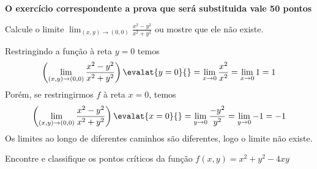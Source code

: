 \documentclass[a4paper,12pt,fleqn]{article}
\begin{document}

\textbf{O exercício correspondente a prova que será substituida vale 50 pontos}

%
%

Calcule o limite
\(
  \lim_{(x, y) \to (0, 0)} \frac{x^2 - y^2}{x^2 + y^2}
\)
ou mostre que ele não existe.

\begin{answer}
  Restringindo a função à reta \( y = 0 \) temos
  \[
    \left(\lim_{(x, y) \to (0, 0)} \frac{x^2 - y^2}{x^2 + y^2}\right) \evalat{y=0}{}
    = \lim_{x\to 0} \frac{x^2}{x^2}
    = \lim_{x\to 0} 1
    = 1
  \]
  Porém, se restringirmos $f$ à reta \( x = 0 \), temos
  \[
    \left(\lim_{(x, y) \to (0, 0)} \frac{x^2 - y^2}{x^2 + y^2}\right) \evalat{x=0}{}
    = \lim_{y\to 0} \frac{-y^2}{y^2}
    = \lim_{y\to 0} -1
    = -1
  \]
  Os limites ao longo de diferentes caminhos são diferentes, logo o limite não existe.
  \clearpage
\end{answer}

Encontre e classifique os pontos críticos da função
\(
  f(x, y) = x^2 + y^2 - 4xy
\)
\end{document}
